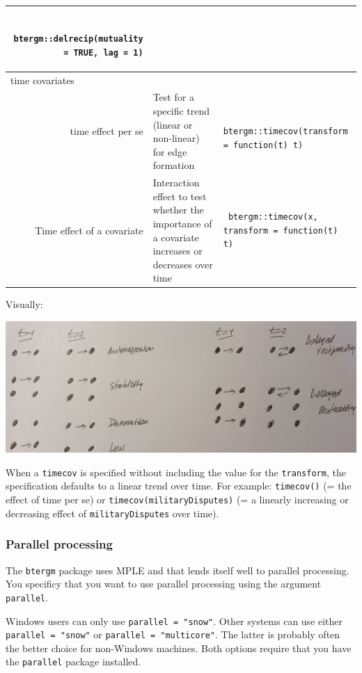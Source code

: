 \documentclass[
]{article}
\begin{document}
\begin{longtable}{r|ll}
\begin{verbatim}
 btergm::delrecip(mutuality = TRUE, lag = 1)
\end{verbatim} \\ 
\midrule
\multicolumn{1}{l}{time covariates} \\ 
\midrule
time effect per se & Test for a specific trend (linear or non-linear) for edge formation & \begin{verbatim}
 btergm::timecov(transform = function(t) t)
\end{verbatim} \\ 
Time effect of a covariate & Interaction effect to test whether the importance of a covariate increases or decreases over time & \begin{verbatim}
 btergm::timecov(x, transform = function(t) t)
\end{verbatim} \\ 
\bottomrule
\end{longtable}

Visually:

\includegraphics{tergm_terms.jpg}

When a \texttt{timecov} is specified without including the value for the
\texttt{transform}, the specification defaults to a linear trend over
time. For example: \texttt{timecov()} (= the effect of time per se) or
\texttt{timecov(militaryDisputes)} (= a linearly increasing or
decreasing effect of \texttt{militaryDisputes} over time).

\hypertarget{parallel-processing}{%
\subsubsection{Parallel processing}\label{parallel-processing}}

The \texttt{btergm} package uses MPLE and that lends itself well to
parallel processing. You specificy that you want to use parallel
processing using the argument \texttt{parallel}.

Windows users can only use \texttt{parallel\ =\ "snow"}. Other systems
can use either \texttt{parallel\ =\ "snow"} or
\texttt{parallel\ =\ "multicore"}. The latter is probably often the
better choice for non-Windows machines. Both options require that you
have the \texttt{parallel} package installed.
\end{document}
